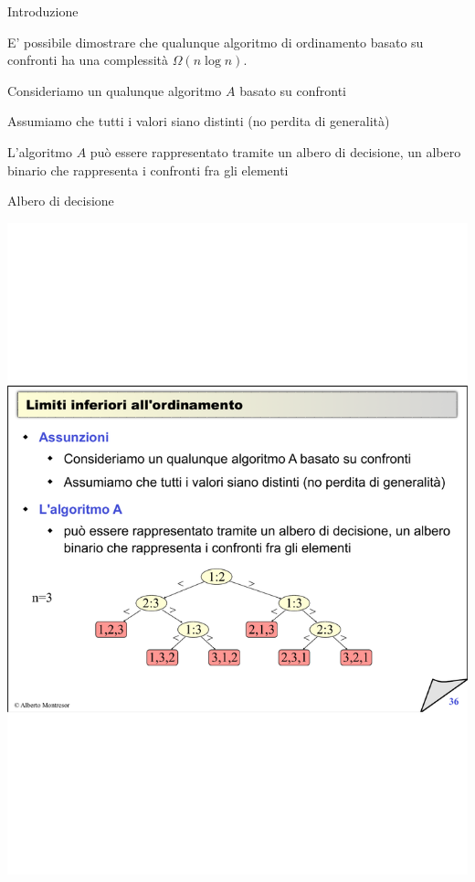 \begin{frame}{Introduzione}

\vspace{-9pt}
\begin{myboxtitle}
E' possibile dimostrare che qualunque algoritmo di ordinamento \alert{basato su confronti} ha una complessità 
$\Omega(n \log n)$.
\end{myboxtitle}

\begin{myboxtitle}[Assunzioni]
\BI
\item Consideriamo un qualunque algoritmo $A$ basato su confronti
\item Assumiamo che tutti i valori siano distinti (no perdita di generalità)
\item L'algoritmo $A$  può essere rappresentato tramite un \alert{albero di decisione}, un albero binario che rappresenta i confronti fra gli elementi
\EI
\end{myboxtitle}

\end{frame}%

\begin{frame}{Albero di decisione}
	
\includegraphics[width=\textwidth]{albero-ordinamento.pdf}	
	
\end{frame}%

